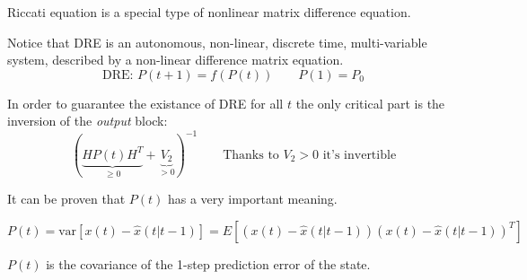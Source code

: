 \begin{remark}
    Riccati equation is a special type of nonlinear matrix difference equation.

    Notice that DRE is an autonomous, non-linear, discrete time, multi-variable system, described by a non-linear difference matrix equation.
    \[
        \text{DRE: } P(t+1) = f(P(t)) \qquad P(1) = P_0
    \]
\end{remark}

\begin{remark}
    In order to guarantee the existance of DRE for all $t$ the only critical part is the inversion of the \emph{output} block:
    \[
        ( \underbrace{HP(t)H^T}_{\ge 0} + \underbrace{V_2}_{>0})^{-1} \qquad \text{Thanks to $V_2>0$ it's invertible}
    \]
\end{remark}

\begin{remark}[Meaning of $P(t)$]
    It can be proven that $P(t)$ has a very important meaning.

    \[
        P(t) = \text{var}[x(t) - \hat{x}(t|t-1)] = E[(x(t) - \hat{x}(t|t-1))(x(t) - \hat{x}(t|t-1))^T]
    \]

    $P(t)$ is the covariance of the 1-step prediction error of the state.
\end{remark}

